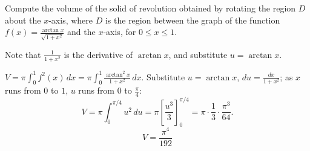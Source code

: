 
\begin{question}
Compute the volume of the solid of revolution obtained by rotating the region $D$ about the $x$-axis, where $D$ is the region between the graph of the function $f(x)=\frac{\arctan x}{\sqrt{1+x^2}}$ and the $x$-axis, for $0\le x\le1$.
\end{question}

\begin{hint}
Note that $\frac{1}{1+x^2}$ is the derivative of $\arctan x$, and substitute $u=\arctan x$.
\end{hint}

\begin{solution}
$V=\pi\int_0^1 f^2(x)\,dx=\pi\int_0^1\frac{\arctan^2x}{1+x^2}\,dx$. Substitute $u=\arctan x$, $du=\frac{dx}{1+x^2}$; as $x$ runs from $0$ to $1$, $u$ runs from $0$ to $\frac\pi4$:
\[ V=\pi\int_0^{\pi/4}u^2\,du=\pi\left[\frac{u^3}{3}\right]_0^{\pi/4}=\pi\cdot\frac{1}{3}\cdot\frac{\pi^3}{64}. \]
\[ \boxed{V=\frac{\pi^4}{192}} \]
\end{solution}
